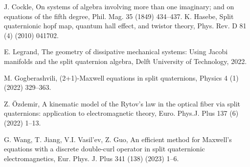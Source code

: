 \documentclass[1p]{elsarticle}
\numberwithin{equation}{section}
\begin{document}
\begin{thebibliography}{99}






 J. Cockle, On systems of algebra involving more than one imaginary; and on equations of the fifth degree, Phil. Mag. 35 (1849) 434–437.
 K. Hasebe, Split quaternionic hopf map, quantum hall effect, and twistor theory, Phys. Rev. D 81 (4) (2010) 041702.

 E. Legrand, The geometry of dissipative mechanical systems: Using Jacobi manifolds and the split quaternion algebra, Delft University of
Technology, 2022.

 M. Gogberashvili, (2+1)-Maxwell equations in split quaternions, Physics 4 (1) (2022) 329–363.

 Z. Özdemir, A kinematic model of the Rytov’s law in the optical fiber via split quaternions: application to electromagnetic theory, Euro. Phys.J. Plus 137 (6) (2022) 1–13.

 G. Wang, T. Jiang, V.I. Vasil’ev, Z. Guo, An efficient method for Maxwell’s equations with a discrete double-curl operator in split quaternionic
electromagnetics, Eur. Phys. J. Plus 341 (138) (2023) 1–6.


\end{thebibliography}
\end{document}
